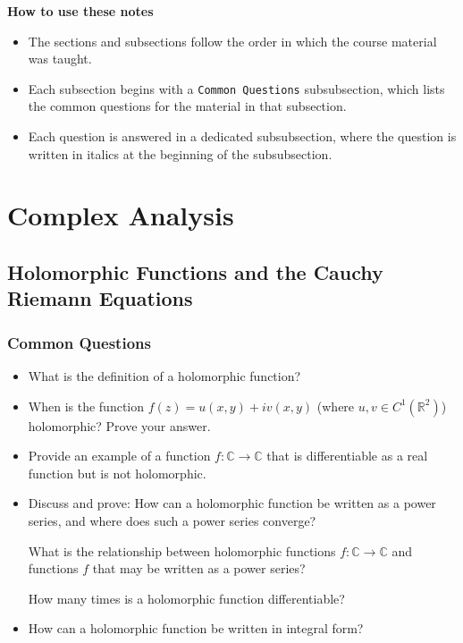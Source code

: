 \documentclass[11pt, a4paper]{article}
\newcommand{\R}{\mathbb{R}} %
\newcommand{\C}{\mathbb{C}} %
\begin{document}
\vspace{5mm}
\textbf{How to use these notes}
\begin{itemize}
    \item The sections and subsections follow the order in which the course material was taught.

    \item Each subsection begins with a \texttt{Common Questions} subsubsection, which lists the common questions for the material in that subsection.

    \item  Each question is answered in a dedicated subsubsection, where the question is written in italics at the beginning of the subsubsection.
\end{itemize}


\newpage

\tableofcontents

\newpage
\section{Complex Analysis}

\subsection{Holomorphic Functions and the Cauchy Riemann Equations}

\subsubsection{Common Questions}
\begin{itemize}
	\item What is the definition of a holomorphic function?
	
	\item When is the function $ f(z) = u(x, y) + iv(x, y) $ (where $ u, v \in C^{1}(\R^2)$) holomorphic? Prove your answer. 
	
	\item Provide an example of a function $ f: \C \to \C $ that is differentiable as a real function but is not holomorphic.
	
	\item Discuss and prove: How can a holomorphic function be written as a power series, and where does such a power series converge?
	
	What is the relationship between holomorphic functions $ f:\C \to \C $ and functions $ f $ that may be written as a power series?
	
	How many times is a holomorphic function differentiable? 
	
	 \item How can a holomorphic function be written in integral form? 

\end{itemize}
\end{document}
